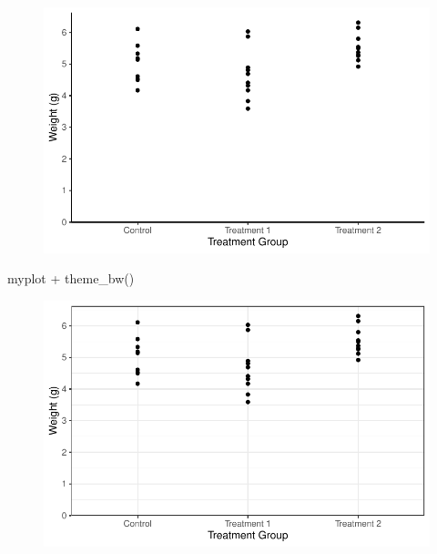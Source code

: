 \documentclass[
  letterpaper,
  DIV=11,
  numbers=noendperiod]{scrartcl}
\newenvironment{Shaded}{\begin{snugshade}}{\end{snugshade}}
\newcommand{\FunctionTok}[1]{\textcolor[rgb]{0.28,0.35,0.67}{#1}}
\newcommand{\NormalTok}[1]{\textcolor[rgb]{0.00,0.23,0.31}{#1}}
\newcommand{\SpecialCharTok}[1]{\textcolor[rgb]{0.37,0.37,0.37}{#1}}
\begin{document}
\begin{figure}[H]

{\centering \includegraphics{ggplot2intro_files/figure-pdf/unnamed-chunk-19-1.pdf}

}

\end{figure}

\begin{Shaded}
\begin{Highlighting}[]
\NormalTok{myplot }\SpecialCharTok{+}
  \FunctionTok{theme\_bw}\NormalTok{()}
\end{Highlighting}
\end{Shaded}

\begin{figure}[H]

{\centering \includegraphics{ggplot2intro_files/figure-pdf/unnamed-chunk-20-1.pdf}

}

\end{figure}
\end{document}
